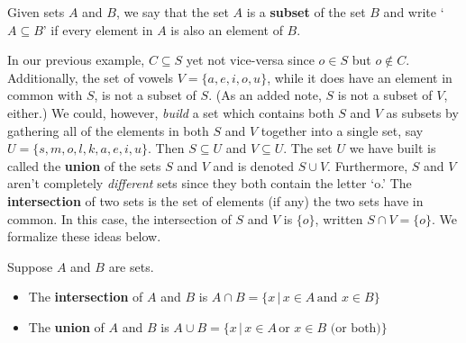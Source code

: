 \documentclass{ximera}
\begin{document}
 


\begin{definition} \label{subsetdef}

Given sets $A$ and $B$, we say that the set $A$ is a \textbf{subset} of the set $B$ and write `$A \subseteq B$' if every element in $A$ is also an element of $B$.  

\end{definition}


In our previous example, $C \subseteq S$ yet not vice-versa since $o \in S$ but $o \notin C$.  Additionally, the set of vowels $V = \{ a, e, i, o, u\}$, while it does have an element in common with $S$, is not a subset of $S$. (As an added note,  $S$ is not a subset of $V$, either.)  We could, however, \textit{build} a set which contains both $S$ and $V$ as subsets by gathering all of the elements in both $S$ and $V$ together into a single set, say $U = \{ s, m, o, l, k, a, e, i, u\}$.   Then $S \subseteq U$ and $V \subseteq U$.  The set $U$ we have built is called the \textbf{union} of the sets $S$ and $V$ and is denoted $S \cup V$.    Furthermore, $S$ and $V$ aren't completely \textit{different} sets since they both contain the letter `o.'  The \textbf{intersection} of two sets is the set of elements (if any) the two sets have in common. In this case, the intersection of $S$ and $V$ is $\{ o\}$, written $S \cap V = \{ o \}$.  We formalize these ideas below.

 


\begin{definition} \label{intersectionunion}  Suppose $A$ and $B$ are sets.

\begin{itemize}

\item The \textbf{intersection} of $A$ and $B$ is $A \cap B = \{ x \, | \, x \in A \, \text{and} \,\, x \in B \}$

\item The \textbf{union} of $A$ and $B$ is $A \cup B = \{ x \, | \, x \in A \, \text{or} \,\, x \in B \, \, \text{(or both)} \}$

\end{itemize}

\end{definition}
\end{document}

